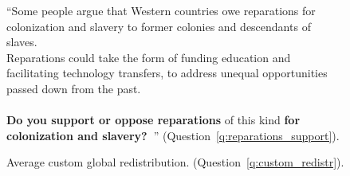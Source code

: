 \begin{figure}[h!]
    \caption[Support for reparations for colonization and slavery]{``Some people argue that Western countries owe reparations for colonization and slavery to former colonies and descendants of slaves. \\Reparations could take the form of funding education and facilitating technology transfers, to address unequal opportunities passed down from the past. \\\\\textbf{Do you support or oppose reparations} of this kind \textbf{for colonization and slavery?~}'' (Question~\ref{q:reparations_support}).
    }\label{fig:reparations_support}
\end{figure}

\begin{figure}[h!]
    \caption[Average custom redistribution]{Average custom global redistribution. (Question~\ref{q:custom_redistr}).
    }\label{fig:custom_redistr_mean}
\end{figure}

